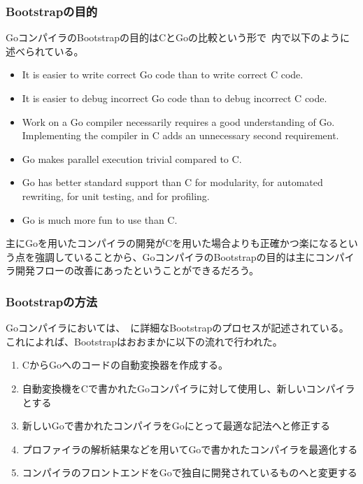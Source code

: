 \subsubsection{Bootstrapの目的}

GoコンパイラのBootstrapの目的はCとGoの比較という形で~\cite{go-compiler-overhaul}内で以下のように述べられている。

\begin{itemize}
\item It is easier to write correct Go code than to write correct C code.
\item It is easier to debug incorrect Go code than to debug incorrect C code.
\item Work on a Go compiler necessarily requires a good understanding of Go. Implementing the compiler in C adds an unnecessary second requirement.
\item Go makes parallel execution trivial compared to C.
\item Go has better standard support than C for modularity, for automated rewriting, for unit testing, and for profiling.
\item Go is much more fun to use than C.
\end{itemize}

主にGoを用いたコンパイラの開発がCを用いた場合よりも正確かつ楽になるという点を強調していることから、GoコンパイラのBootstrapの目的は主にコンパイラ開発フローの改善にあったということができるだろう。

\subsubsection{Bootstrapの方法}

Goコンパイラにおいては、~\cite{go-compiler-overhaul}に詳細なBootstrapのプロセスが記述されている。
これによれば、Bootstrapはおおまかに以下の流れで行われた。

\begin{enumerate}
\item CからGoへのコードの自動変換器を作成する。
\item 自動変換機をCで書かれたGoコンパイラに対して使用し、新しいコンパイラとする
\item 新しいGoで書かれたコンパイラをGoにとって最適な記法へと修正する
\item プロファイラの解析結果などを用いてGoで書かれたコンパイラを最適化する
\item コンパイラのフロントエンドをGoで独自に開発されているものへと変更する
\end{enumerate}

